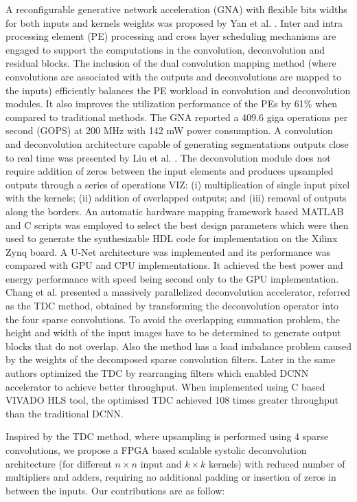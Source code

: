 \documentclass[journal]{IEEEtran}
\begin{document}
A reconfigurable generative network acceleration (GNA) with flexible bits widths for both inputs and kernels weights was proposed by Yan et al. \cite{inproceedings15}. Inter and intra processing element (PE) processing and cross layer scheduling mechanisms are engaged to support the computations in the convolution, deconvolution and residual blocks. The inclusion of the dual convolution mapping method (where convolutions are associated with the outputs and deconvolutions are mapped to the inputs) efficiently balances the PE workload in convolution and deconvolution modules. It also improves the utilization performance of the PEs by 61\% when compared to traditional methods. The GNA reported a 409.6 giga operations per second (GOPS) at 200 MHz with 142 mW power consumption. A convolution and deconvolution architecture capable of generating segmentations outputs close to real time was presented by Liu et al. \cite{inproceedings2}. The deconvolution module does not require addition of zeros between the input elements and produces upsampled outputs through a series of operations VIZ: (i) multiplication of single input pixel with the kernels; (ii) addition of overlapped outputs; and (iii) removal of outputs along the borders. An automatic hardware mapping framework based MATLAB and C scripts was employed to select the best design parameters which were then used to generate the synthesizable HDL code for implementation on the Xilinx Zynq board. A U-Net architecture was implemented and its performance was compared with GPU and CPU implementations. It achieved the best power and energy performance with speed being second only to the GPU implementation. Chang et al. \cite{inproceedings19} presented a massively parallelized  deconvolution accelerator, referred as the TDC method, obtained by transforming the deconvolution operator into the four sparse convolutions. To avoid the overlapping summation problem, the height and width of the input images have to be determined to generate output  blocks that do not overlap. Also the method has a load imbalance problem caused by the weights of the decomposed sparse convolution filters. Later in \cite{article18} the same authors optimized the TDC by rearranging filters which enabled DCNN  accelerator to achieve  better  throughput. When implemented using C based VIVADO HLS tool, the optimised TDC achieved 108  times greater throughput than the traditional DCNN.

Inspired by the TDC method, where upsampling is performed using 4 sparse convolutions, we propose a FPGA based scalable systolic deconvolution architecture (for different $n \times n$ input and $k\times k$ kernels) with reduced  number of multipliers and adders, requiring no additional padding or insertion of zeros in between the inputs. Our contributions are as follow:
\end{document}
